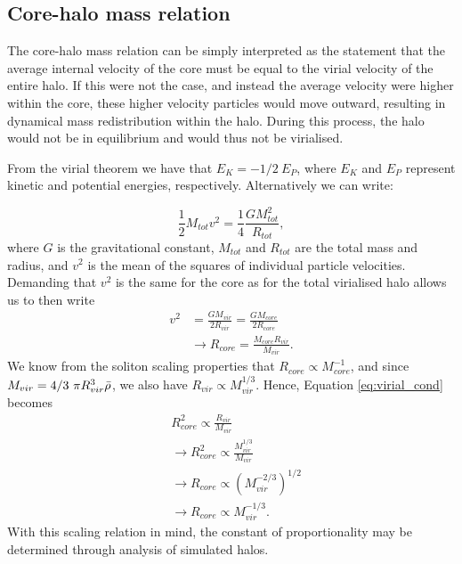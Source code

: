 \documentclass[a4paper,11pt]{article}
\begin{document}
\begin{appendices}
\section{Core-halo mass relation}\label{app:core-halo}

The core-halo mass relation can be simply interpreted as the statement that the average internal velocity of the core must be equal to the virial velocity of the entire halo. If this were not the case, and instead the average velocity were higher within the core, these higher velocity particles would move outward, resulting in dynamical mass redistribution within the halo. During this process, the halo would not be in equilibrium and would thus not be virialised.

From the virial theorem we have that $E_K=-1/2 \ E_P$, where $E_K$ and $E_P$ represent kinetic and potential energies, respectively. Alternatively we can write:

\begin{equation}
    \frac{1}{2}M_{tot}v^2=\frac{1}{4}\frac{GM_{tot}^2}{R_{tot}},
\end{equation}
where $G$ is the gravitational constant, $M_{tot}$ and $R_{tot}$ are the total mass and radius, and $v^2$ is the mean of the squares of individual particle velocities. Demanding that $v^2$ is the same for the core as for the total virialised halo allows us to then write
\begin{align}\label{eq:virial_cond}
    v^2&=\frac{GM_{vir}}{2 R_{vir}}=\frac{G M_{core}}{2 R_{core}}\nonumber\\
    &\rightarrow R_{core}=\frac{M_{core} R_{vir}}{M_{vir}}.
\end{align}
We know from the soliton scaling properties that $R_{core}\propto M_{core}^{-1}$, and since $M_{vir}=4/3 \ \pi R_{vir}^3 \Bar{\rho}$, we also have $R_{vir} \propto M_{vir}^{1/3}$. Hence, Equation \ref{eq:virial_cond} becomes
\begin{align}
    &R_{core}^2\propto \frac{R_{vir}}{M_{vir}}\nonumber\\
    &\rightarrow R_{core}^2\propto \frac{M_{vir}^{1/3}}{M_{vir}}\nonumber\\
    &\rightarrow R_{core}\propto\left(M_{vir}^{-2/3}\right)^{1/2}\nonumber\\
    &\rightarrow R_{core}\propto M_{vir}^{-1/3}.
\end{align}
With this scaling relation in mind, the constant of proportionality may be determined through analysis of simulated halos. 





\end{appendices}
\end{document}
